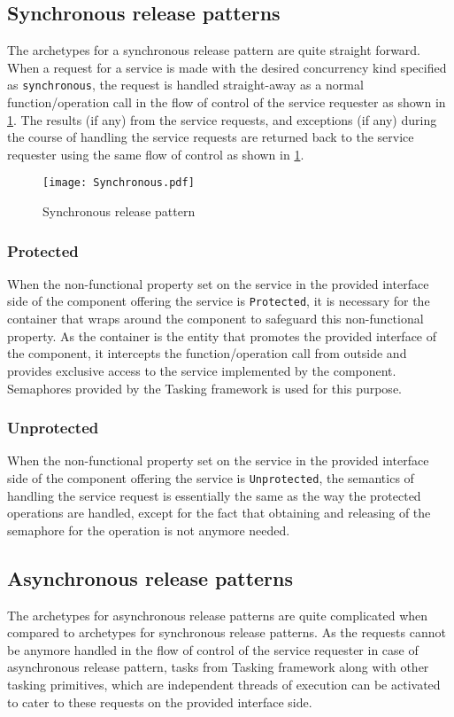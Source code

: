 \subsection{Synchronous release patterns}
The archetypes for a synchronous release pattern are quite straight forward. When a request for a service is made with the desired concurrency kind specified as \texttt{synchronous}, the request is handled straight-away as a normal function/operation call in the flow of control of the service requester as shown in \cref{fig: Synchronous call}. The results (if any) from the service requests, and exceptions (if any) during the course of handling the service requests are returned back to the service requester using the same flow of control as shown in \cref{fig: Synchronous call}.

\begin{figure}[h]
	\centering
	\texttt{[image: Synchronous.pdf]}
	\caption{Synchronous release pattern}
	\label{fig: Synchronous call}
\end{figure}

\subsubsection{\textbf{Protected}}
When the non-functional property set on the service in the provided interface side of the component offering the service is \texttt{Protected}, it is necessary for the container that wraps around the component to safeguard this non-functional property. As the container is the entity that promotes the provided interface of the component, it intercepts the function/operation call from outside and provides exclusive access to the service implemented by the component. Semaphores provided by the Tasking framework is used for this purpose.

\subsubsection{\textbf{Unprotected}}
When the non-functional property set on the service in the provided interface side of the component offering the service is \texttt{Unprotected}, the semantics of handling the service request is essentially the same as the way the protected operations are handled, except for the fact that obtaining and releasing of the semaphore for the operation is not anymore needed.

\subsection{Asynchronous release patterns}
\label{subsection: asynchronous patterns}
The archetypes for asynchronous release patterns are quite complicated when compared to archetypes for synchronous release patterns. As the requests cannot be anymore handled in the flow of control of the service requester in case of asynchronous release pattern, tasks from Tasking framework along with other tasking primitives, which are independent threads of execution can be activated to cater to these requests on the provided interface side. 

